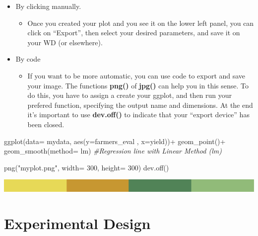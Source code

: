 \documentclass[
]{book}
\newenvironment{Shaded}{\begin{snugshade}}{\end{snugshade}}
\newcommand{\AttributeTok}[1]{\textcolor[rgb]{0.77,0.63,0.00}{#1}}
\newcommand{\CommentTok}[1]{\textcolor[rgb]{0.56,0.35,0.01}{\textit{#1}}}
\newcommand{\DecValTok}[1]{\textcolor[rgb]{0.00,0.00,0.81}{#1}}
\newcommand{\FunctionTok}[1]{\textcolor[rgb]{0.00,0.00,0.00}{#1}}
\newcommand{\NormalTok}[1]{#1}
\newcommand{\SpecialCharTok}[1]{\textcolor[rgb]{0.00,0.00,0.00}{#1}}
\newcommand{\StringTok}[1]{\textcolor[rgb]{0.31,0.60,0.02}{#1}}
\providecommand{\tightlist}{%
  \setlength{\itemsep}{0pt}\setlength{\parskip}{0pt}}
\begin{document}
\begin{itemize}
\item
  By clicking manually.

  \begin{itemize}
  \tightlist
  \item
    Once you created your plot and you see it on the lower left panel, you can click on ``Export'', then select your desired parameters, and save it on your WD (or elsewhere).
  \end{itemize}
\item
  By code

  \begin{itemize}
  \tightlist
  \item
    If you want to be more automatic, you can use code to export and save your image. The functions \textbf{png()} of \textbf{jpg()} can help you in this sense. To do this, you have to assign a create your ggplot, and then run your prefered function, specifying the output name and dimensions. At the end it's important to use \textbf{dev.off()} to indicate that your ``export device'' has been closed.
  \end{itemize}
\end{itemize}

\begin{Shaded}
\begin{Highlighting}[]
\FunctionTok{ggplot}\NormalTok{(}\AttributeTok{data=}\NormalTok{ mydata, }\FunctionTok{aes}\NormalTok{(}\AttributeTok{y=}\NormalTok{farmers\_eval ,  }\AttributeTok{x=}\NormalTok{yield))}\SpecialCharTok{+}
                   \FunctionTok{geom\_point}\NormalTok{()}\SpecialCharTok{+}
                   \FunctionTok{geom\_smooth}\NormalTok{(}\AttributeTok{method=}\NormalTok{ lm) }\CommentTok{\#Regression line with Linear Method (lm)}

\FunctionTok{png}\NormalTok{(}\StringTok{"myplot.png"}\NormalTok{, }\AttributeTok{width=} \DecValTok{300}\NormalTok{, }\AttributeTok{height=} \DecValTok{300}\NormalTok{)}
\FunctionTok{dev.off}\NormalTok{()}
\end{Highlighting}
\end{Shaded}

\includegraphics{rsrstrip.png}

\hypertarget{experimental-design}{%
\chapter{Experimental Design}\label{experimental-design}}
\end{document}
